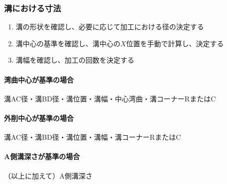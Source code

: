 \subsubsection{溝における寸法}
\begin{enumerate}
\item 溝の形状を確認し、必要に応じて加工における径の決定する
\item {}溝中心の基準を確認し、溝中心の$X$位置を手動で計算し、決定する
\item {}溝幅を確認し、加工の回数を決定する
\end{enumerate}
\begin{Tabbox}[title={必要な図面上のパラメータ}]\small
\paragraph*{湾曲中心が基準の場合}
溝AC径・溝BD径・溝位置・溝幅・中心湾曲・溝コーナーRまたはC
\tcbline*
\paragraph*{外削中心が基準の場合}
溝AC径・溝BD径・溝位置・溝幅・溝コーナーRまたはC
\tcbline*
\paragraph*{A側溝深さが基準の場合}
（以上に加えて）A側溝深さ
\end{Tabbox}

